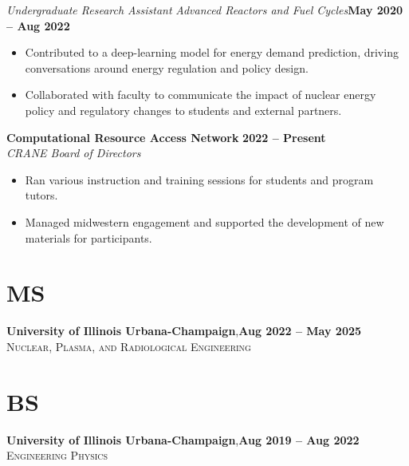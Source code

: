 \documentclass[margin,line]{resume}
\begin{document}
\begin{resume}
    \textsl{Undergraduate Research Assistant} \textsl{Advanced Reactors and Fuel Cycles}\hfill \textbf{May 2020 -- Aug 2022}\\
    \begin{itemize}
        \item Contributed to a deep-learning model for energy demand prediction, driving conversations around energy regulation and policy design.
        \item Collaborated with faculty to communicate the impact of nuclear energy policy and regulatory changes to students and external partners.
    \end{itemize}

    \textbf{Computational Resource Access Network} \hfill \textbf{2022 -- Present} \\
    \textsl{CRANE Board of Directors} \\
    \begin{itemize}
        \item Ran various instruction and training sessions for students and program tutors.
        \item Managed midwestern engagement and supported the development of new materials for participants.
    \end{itemize}

    \section{\mysidestyle MS}
    \textbf{University of Illinois Urbana-Champaign},\hfill\textbf{Aug 2022 -- May 2025}\\
    \textsc{Nuclear, Plasma, and Radiological Engineering}\\
    \vspace{-5.5mm}
    \section{\mysidestyle BS}
    \textbf{University of Illinois Urbana-Champaign},\hfill\textbf{Aug 2019 -- Aug 2022}\\%
    \textsc{Engineering Physics}\\
    \vspace{-5mm}
    \vspace{-4mm}

\end{resume}
\end{document}
